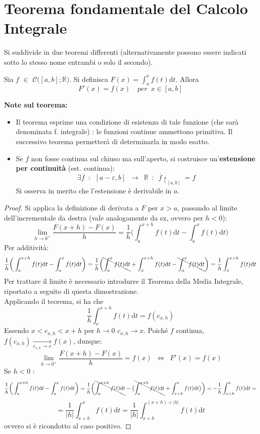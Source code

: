 \documentclass[10pt, oneside]{book}
\theoremstyle{plain}
\begin{document}
\section{Teorema fondamentale del Calcolo Integrale}
Si suddivide in due teoremi differenti (alternativamente possono essere indicati sotto lo stesso nome entrambi o solo il secondo).

\begin{ther}[Teorema 1]
    Sia $f$ $\in$ $\mathcal{C}\big([a,b] ; \mathbb{R}\big)$. Si definisca $F(x) = \int_a^x f(t) \textrm{d}t$. Allora
    \[F'(x) = f(x) \quad per \enspace x \in [a,b]\]
\end{ther}
\textbf{Note sul teorema:}
\begin{itemize}[label=$\blacksquare$]
    \item Il teorema esprime una condizione di esistenza di tale funzione (che sarà denominata f. integrale) : le funzioni continue ammettono primitiva. Il successivo teorema permetterà di determinarla in modo esatto.
    \item Se $f$ non fosse continua sul chiuso ma sull'aperto, si costruisce un'\textbf{estensione per continuità} (est. continua):
    \[\exists \overline{f} \enspace : \enspace [a-\varepsilon,b] \enspace \rightarrow \enspace \mathbb{R} \enspace : \enspace \overline{f}\restriction_{[a,b]} = f\]
    Si osserva in merito che l'estensione è derivabile in $a$.
\end{itemize}

\begin{proof}
    Si applica la definizione di derivata a $F$ per $x>a$, passando al limite dell'incrementale da destra (vale analogamente da sx, ovvero per $h < 0$):
    \[\lim\limits_{h \rightarrow 0^+} \frac{F(x+h) - F(x)}{h} = \frac{1}{h}\bigg(\int_a^{x+h}f(t)\textrm{d}t - \int_a^{x}f(t)\textrm{d}t\bigg)\]
    Per additività:
    \[\frac{1}{h}\bigg(\int_a^{x+h}f(t)\textrm{d}t - \int_a^{x}f(t)\textrm{d}t\bigg) = \frac{1}{h}\bigg(\bcancel{\int_a^{x}f(t)\textrm{d}t} + \int_x^{x+h}f(t)\textrm{d}t- \bcancel{\int_a^{x}f(t)\textrm{d}t}\bigg) = \frac{1}{h}\int_x^{x+h}f(t)\textrm{d}t\]
    Per trattare il limite è necessario introdurre il Teorema della Media Integrale, riportato a seguito di questa dimostrazione.
    \\Applicando il teorema, si ha che 
    \[ \frac{1}{h}\int_x^{x+h}f(t)\textrm{d}t = f(c_{x,h})\]
    Essendo $x < c_{x,h} < x+h$ per $h \rightarrow 0$ $c_{x,h} \rightarrow x$. Poiché $f$ continua, $f(c_{x,h}) \xrightarrow[c_{x,h} \rightarrow x]{} f(x)$, dunque:
    \[\lim\limits_{h \rightarrow 0^+} \frac{F(x+h) - F(x)}{h} = f(x) \enspace \Longleftrightarrow \enspace F'(x) = f(x)\]
    Se $h < 0$ :
    \[\frac{1}{h}\bigg(\int_a^{x+h}f(t)\textrm{d}t - \int_a^{x}f(t)\textrm{d}t\bigg) = \frac{1}{h}\bigg(\bcancel{\int_a^{x+h}f(t)\textrm{d}t} - \big(\bcancel{\int_a^{x+h}f(t)\textrm{d}t} + \int_{x+h}^{x}f(t)\textrm{d}t\big)\bigg) = - \frac{1}{h}\int_{x+h}^{x}f(t)\textrm{d}t =\]
    \[= \frac{1}{|h|}\int_{x+h}^{x}f(t)\textrm{d}t = \frac{1}{|h|}\int_{x+h}^{(x+h) + |h|}f(t)\textrm{d}t\]
    ovvero si è ricondotto al caso positivo.
\end{proof}
\end{document}

